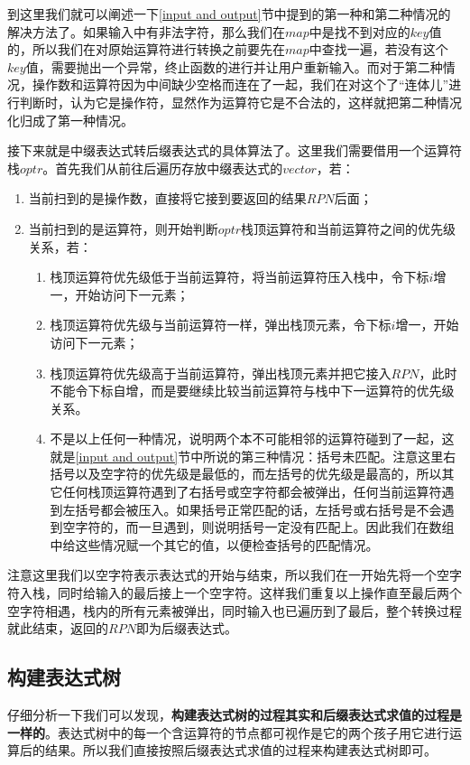 \documentclass[UTF8]{ctexart}
\begin{document}
		\indent 到这里我们就可以阐述一下\ref{input and output}节中提到的第一种和第二种情况的解决方法了。如果输入中有非法字符，那么我们在$map$中是找不到对应的$key$值的，所以我们在对原始运算符进行转换之前要先在$map$中查找一遍，若没有这个$key$值，需要抛出一个异常，终止函数的进行并让用户重新输入。而对于第二种情况，操作数和运算符因为中间缺少空格而连在了一起，我们在对这个了“连体儿”进行判断时，认为它是操作符，显然作为运算符它是不合法的，这样就把第二种情况化归成了第一种情况。
		
		\indent 接下来就是中缀表达式转后缀表达式的具体算法了。这里我们需要借用一个运算符栈$optr$。首先我们从前往后遍历存放中缀表达式的$vector$，若：
		\begin{enumerate}
			\item 当前扫到的是操作数，直接将它接到要返回的结果$RPN$后面；
			\item 当前扫到的是运算符，则开始判断$optr$栈顶运算符和当前运算符之间的优先级关系，若：
			\begin{enumerate}
				\item 栈顶运算符优先级低于当前运算符，将当前运算符压入栈中，令下标$i$增一，开始访问下一元素；
				\item 栈顶运算符优先级与当前运算符一样，弹出栈顶元素，令下标$i$增一，开始访问下一元素；
				\item 栈顶运算符优先级高于当前运算符，弹出栈顶元素并把它接入$RPN$，此时不能令下标自增，而是要继续比较当前运算符与栈中下一运算符的优先级关系。
				\item 不是以上任何一种情况，说明两个本不可能相邻的运算符碰到了一起，这就是\ref{input and output}节中所说的第三种情况：括号未匹配。注意这里右括号以及空字符的优先级是最低的，而左括号的优先级是最高的，所以其它任何栈顶运算符遇到了右括号或空字符都会被弹出，任何当前运算符遇到左括号都会被压入。如果括号正常匹配的话，左括号或右括号是不会遇到空字符的，而一旦遇到，则说明括号一定没有匹配上。因此我们在数组中给这些情况赋一个其它的值，以便检查括号的匹配情况。
			\end{enumerate}

		\end{enumerate}	
		
		\indent 注意这里我们以空字符表示表达式的开始与结束，所以我们在一开始先将一个空字符入栈，同时给输入的最后接上一个空字符。这样我们重复以上操作直至最后两个空字符相遇，栈内的所有元素被弹出，同时输入也已遍历到了最后，整个转换过程就此结束，返回的$RPN$即为后缀表达式。
		
		\subsection{构建表达式树}\label{con tree}
		\indent 仔细分析一下我们可以发现，\textbf{构建表达式树的过程其实和后缀表达式求值的过程是一样的}。表达式树中的每一个含运算符的节点都可视作是它的两个孩子用它进行运算后的结果。所以我们直接按照后缀表达式求值的过程来构建表达式树即可。
		
\end{document}

